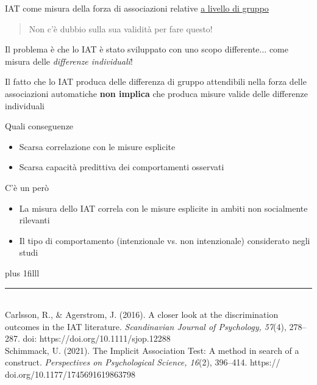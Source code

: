 \documentclass{beamer}
\begin{document}
\begin{frame}
	IAT come misura della forza di associazioni relative \underline{a livello di gruppo}
	
	\vspace{1.5mm}
	\begin{quote}
		Non c'è dubbio sulla sua validità per fare questo!
	\end{quote}
	
	\pause
	\vspace{1.5mm}
	
	Il problema è che lo IAT è stato sviluppato con uno scopo differente... come misura delle \emph{differenze individuali}!
	
	\pause 
	\vspace{1.5mm}
	
	Il fatto che lo IAT produca delle differenza di gruppo attendibili nella forza delle associazioni automatiche  \textbf{non implica} che produca misure valide delle differenze individuali
	
	
\end{frame}

\begin{frame}{Quali conseguenze}
	\begin{itemize}
		\item Scarsa correlazione con le misure esplicite
		\vspace{1.5mm}
		\item Scarsa capacità predittiva dei comportamenti osservati 
	\end{itemize}
	
	\pause
\begin{center}
C'è un però
\end{center}

\begin{itemize}
	\item La misura dello IAT correla con le misure esplicite in ambiti non socialmente rilevanti 
	\item Il tipo di comportamento (intenzionale vs. non intenzionale) considerato negli studi 
\end{itemize}

\vskip0pt plus 1filll

\color{template}\rule{0.30\linewidth}{0.5pt}\\
\color{black}
\footnotesize{Carlsson, R., \& Agerstrom, J. (2016). A closer look at the discrimination outcomes in the IAT literature. \emph{Scandinavian Journal of Psychology, 57}(4), 278–287. doi:
	https://doi.org/10.1111/sjop.12288\\
	Schimmack, U. (2021). The Implicit Association Test:
	A method in search of a construct. \emph{Perspectives on
		Psychological Science, 16}(2), 396–414. https://
	doi.org/10.1177/1745691619863798}
\end{frame}
\end{document}
